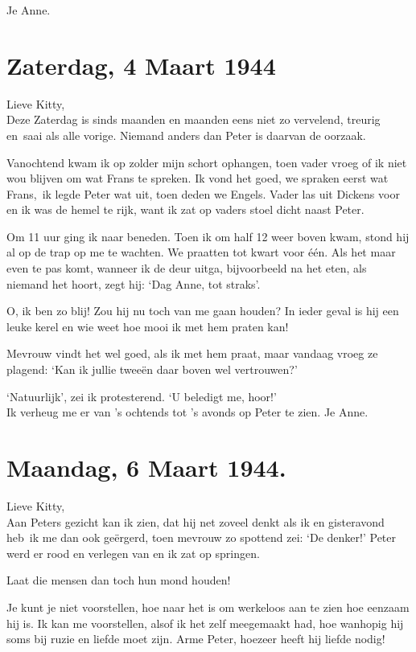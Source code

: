 \documentclass{book}
\begin{document}
Je Anne.

\section*{Zaterdag, 4 Maart 1944}

Lieve Kitty,\\
Deze Zaterdag is sinds maanden en maanden eens niet zo vervelend,
treurig en~saai als alle vorige. Niemand anders dan Peter is daarvan de oorzaak.

Vanochtend kwam ik op zolder mijn schort ophangen, toen vader vroeg of ik niet
wou blijven om wat Frans te spreken. Ik vond het goed, we spraken eerst wat
Frans,~ik legde Peter wat uit, toen deden we Engels.  Vader las uit Dickens voor
en ik was de hemel te rijk, want ik zat op vaders stoel dicht naast Peter.

Om 11 uur ging ik naar beneden. Toen ik om half 12 weer boven kwam, stond hij al
op de trap op me te wachten. We praatten tot kwart voor één. Als het maar even
te pas komt, wanneer ik de deur uitga, bijvoorbeeld na het eten, als niemand het
hoort, zegt hij: `Dag Anne, tot straks'.

O, ik ben zo blij! Zou hij nu toch van me gaan houden? In ieder geval is hij een
leuke kerel en wie weet hoe mooi ik met hem praten kan!

Mevrouw vindt het wel goed, als ik met hem praat, maar vandaag vroeg ze plagend:
`Kan ik jullie tweeën daar boven wel vertrouwen?'

`Natuurlijk', zei ik protesterend. `U beledigt me, hoor!'\\
Ik verheug me er van
's ochtends tot 's avonds op Peter te zien. Je Anne.

\section*{Maandag, 6 Maart 1944.}

Lieve Kitty,\\
Aan Peters gezicht kan ik zien, dat hij net zoveel denkt als ik
en gisteravond heb~ik me dan ook geërgerd, toen mevrouw zo spottend zei: `De
denker!' Peter werd er rood en verlegen van en ik zat op springen.

Laat die mensen dan toch hun mond houden!

Je kunt je niet voorstellen, hoe naar het is om werkeloos aan te zien hoe
eenzaam hij is. Ik kan me voorstellen, alsof ik het zelf meegemaakt had, hoe
wanhopig hij soms bij ruzie en liefde moet zijn. Arme Peter, hoezeer heeft hij
liefde nodig!
\end{document}
